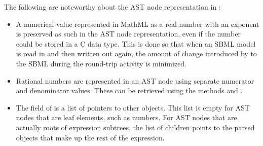 \documentclass{sbmlmanual}
\begin{document}
The following are noteworthy about the AST node representation in \libsbml{}:

\begin{itemize}
  
\item A numerical value represented in MathML as a real number with an
  exponent is preserved as such in the AST node representation, even if the
  number could be stored in a C  data type.  This is done so
  that when an SBML model is read in and then written out again, the amount
  of change introduced by \libsbml{} to the SBML during the round-trip
  activity is minimized.
  
\item Rational numbers are represented in an AST node using separate
  numerator and denominator values.  These can be retrieved using the
   methods  and
  .
   
  
\item The  field of  is a list of
  pointers to other  objects.  This list is empty for AST
  nodes that are leaf elements, such as numbers.  For AST nodes that are
  actually roots of expression subtrees, the list of children points to the
  parsed objects that make up the rest of the expression.

\end{itemize}







\clearpage



\end{document}

